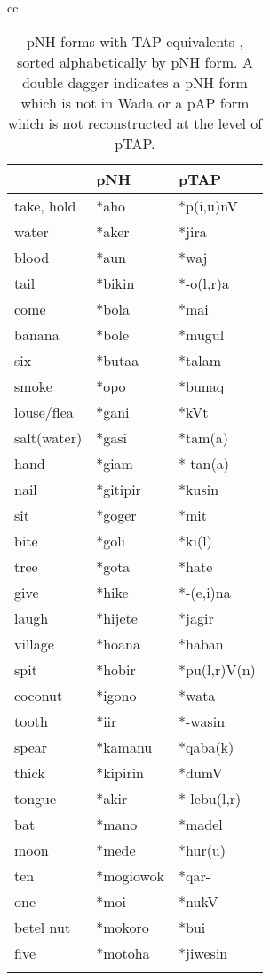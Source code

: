 \clearpage
\begin{table}

\caption[pNH forms with TAP equivalents A-M]{pNH forms \citep[after][]{Wada1980} with TAP equivalents \citep[after][]{SchapperEtAlTVtimor}, sorted alphabetically by pNH form. A double dagger {\ddag} indicates a pNH form which is not in Wada or a pAP form which is not reconstructed at the level of pTAP.\footnotemark{}} 
\label{table_pNH}
\label{tab:4:10}
\footnotesize
\begin{tabularx}{\textwidth}{cc}
\lsptoprule
\begin{tabular}{lll}
 	&  \rm \textbf{pNH\ilt{proto-North-Halmahera}}	& \rm \textbf{pTAP\ilt{proto-Timor Alor Pantar}}\\
    \midrule
take, hold&   *aho	&   *p(i,u)nV {\ddag}\\
water	&   *aker	&  *jira\\
blood	&  *aun	&  *waj\\
tail	&  *bikin	&  *-o(l,r)a\footnotemark{}\\
{\lightgreycell}come	& {\lightgreycell} *bola	& {\lightgreycell} *mai {\ddag}\\
{\lightgreycell}banana	& {\lightgreycell} *bole{\ddag}	& {\lightgreycell} *mugul\\
six	&  *buta{\ng}a	&  *talam\\
smoke	&  *{\dDOT}opo	&  *bunaq {\ddag}\\
louse/flea	&  *gani	&  *kVt {\ddag}\\
salt(water)	&  *gasi	&  *tam(a)\\
hand	&  *giam	&  *-tan(a)\\
nail	&  *gitipir	&  *kusin {\ddag}\\
sit	&  *goger	&  *mit\\
bite	&  *goli	&  *ki(l)\\
{\lightgreycell}tree	& {\lightgreycell} *gota	& {\lightgreycell} *hate\\
give	&  *hike	&  *-(e,i)na\\
laugh	&  *hijete	&  *jagir\\
village	&  *hoana{\ddag}	&  *haban {\ddag}\\
spit	&  *hobir	&  *pu(l,r)V(n)\\
coconut	&  *igono{\ddag}	&  *wata\\
tooth	&  *i{\ng}ir	&  *-wasin\\
{\lightgreycell}spear	& {\lightgreycell} *kamanu	& {\lightgreycell} *qaba(k){\ddag}\\
thick	&  *kipirin	&  *dumV{\ddag}\\
tongue	&  *akir	&  *-lebu(l,r)\\
bat	&  *mano {\ddag}	&  *madel\\
moon	&  *mede	&  *hur(u)\\
ten	&  *mogiowok	&  *qar- {\ddag}\\
one	&  *moi	&  *nukV\\
betel nut	&  *mokoro{\ddag}	&  *bui {\ddag}\\
five	&  *motoha	&  *jiwesin {\ddag}\\
 \\
\end{tabular}


\end{tabularx}
\end{table}
